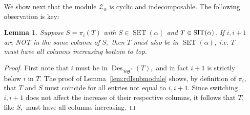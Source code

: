 \documentclass[12pt,letterpaper]{amsart}
\newtheorem{lemma}[theorem]{Lemma}
\theoremstyle{definition}
\newcommand{\rdI}{\mathcal{R}\mathfrak{S}^*}
\DeclareMathOperator{\Des}{Des}
\newcommand{\SET}{\ensuremath{\operatorname{SET}}} \newcommand{\NSET}{\ensuremath{\operatorname{NSET}}}\newcommand{\SRCT}{\ensuremath{\operatorname{SRCT}}}
\begin{document}
We show next that the module  $\mathcal{Z}_\alpha $ is cyclic and indecomposable.
The following observation is key:
\begin{lemma}\label{lem:Z-keylemma}Suppose  $S=\pi_i(T)$ with $S\in \SET(\alpha)$ and  
$T\in \operatorname{SIT}(\alpha)$.  If $i, i+1$ are NOT in the same column of $S,$ then $T$ must also be in $\SET(\alpha)$, i.e. $T$ must have all columns increasing bottom to top. 
\end{lemma}
\begin{proof} First note that $i$ must be in $\Des_{\rdI}(T),$ and in fact $i+1$ is strictly below $i$ in $T.$ The proof of Lemma~\ref{lem:rdIsubmodule} shows, by definition of $\pi_i,$ that $T$ and $S$ must coincide for all entries not equal to $i,i+1.$ Since switching $i, i+1$ does not affect the increase of their respective columns, it follows that  $T,$ like $S,$ must have all columns increasing.
\end{proof}
\end{document}
